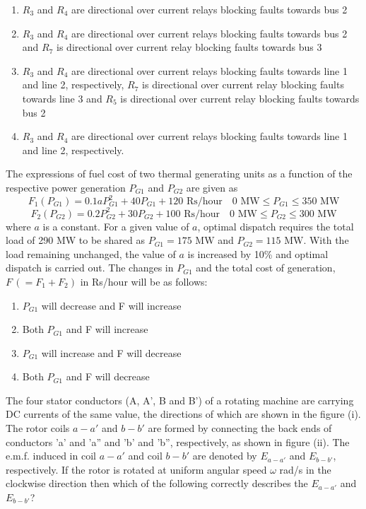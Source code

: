 \begin{enumerate}
    \item $R_3$ and $R_4$ are directional over current relays blocking faults towards bus 2
    \item $R_3$ and $R_4$ are directional over current relays blocking faults towards bus 2 and $R_7$ is directional over current relay blocking faults towards bus 3
    \item $R_3$ and $R_4$ are directional over current relays blocking faults towards line 1 and line 2, respectively, $R_7$ is directional over current relay blocking faults towards line 3 and $R_5$ is directional over current relay blocking faults towards bus 2 
    \item $R_3$ and $R_4$ are directional over current relays blocking faults towards line 1 and line 2, respectively.

\end{enumerate}
\bigskip
\item The expressions of fuel cost of two thermal generating units as a function of the respective power generation $P_{G1}$ and $P_{G2}$ are given as
\[
F_1(P_{G1}) = 0.1a P_{G1}^2 + 40 P_{G1} + 120 \text{ Rs/hour} \quad 0 \text{ MW} \leq P_{G1} \leq 350 \text{ MW}
\]
\[
F_2(P_{G2}) = 0.2 P_{G2}^2 + 30 P_{G2} + 100 \text{ Rs/hour} \quad 0 \text{ MW} \leq P_{G2} \leq 300 \text{ MW}
\]
where $a$ is a constant. For a given value of $a$, optimal dispatch requires the total load of 290 MW to be shared as $P_{G1} = 175 \text{ MW}$ and $P_{G2} = 115 \text{ MW}$. With the load remaining unchanged, the value of $a$ is increased by 10\% and optimal dispatch is carried out. The changes in $P_{G1}$ and the total cost of generation, $F \,(= F_1 + F_2)$ in Rs/hour will be as follows:
\begin{enumerate}

        \item $P_{G1}$ will decrease and F will increase
        \item Both $P_{G1}$ and F will increase
        \item $P_{G1}$ will increase and F will decrease
        \item Both $P_{G1}$ and F will decrease
    
\end{enumerate}
\bigskip
\item The four stator conductors (A, A', B and B') of a rotating machine are carrying DC currents of the same value, the directions of which are shown in the figure (i). The rotor coils \( a-a' \) and \( b-b' \) are formed by connecting the back ends of conductors 'a' and 'a'' and 'b' and 'b'', respectively, as shown in figure (ii). The e.m.f. induced in coil \( a-a' \) and coil \( b-b' \) are denoted by \( E_{a-a'} \) and \( E_{b-b'} \), respectively. If the rotor is rotated at uniform angular speed \( \omega \) rad/s in the clockwise direction then which of the following correctly describes the \( E_{a-a'} \) and \( E_{b-b'} \)?
